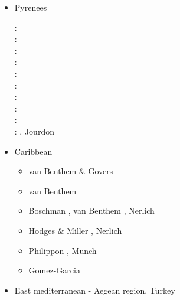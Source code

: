 \begin{itemize}
\item {Pyrenees} 

\begin{scriptsize}
\nineteenninetytwo: \cite{chou92}\\
\nineteenninetythree: \cite{qubh93}\\
\nineteenninetyeight: \cite{giju98}\\
\twothousand: \cite{bemh00}\\
\twothousandfour: \cite{mcmg04}\cite{siss04}\\
\twothousandten: \cite{jaml10}\\
\twothousandtwelve: \cite{vime12}\\
\twothousandthirteen: \cite{fihv13b}\\
\twothousandfourteen: \cite{jahm14}\\
\twothousandnineteen: \cite{dual19}, Jourdon \etal \cite{jolm19}
\end{scriptsize}

\item{Caribbean} 

\begin{scriptsize}
\begin{itemize}
\item[\twothousandten] van Benthem \& Govers \cite{vago10}
\item[\twothousandthirteen] van Benthem \etal \cite{vags13}
\item[\twothousandfourteen] Boschman \etal \cite{bovt14}, van Benthem \etal \cite{vagw14},
                            Nerlich \etal \cite{necb14}
\item[\twothousandfifteen] Hodges \& Miller \cite{homi15}, Nerlich \etal \cite{necb15}
\item[\twothousandtwenty] Philippon \etal \cite{phvb20}, Munch \etal \cite{mugu20}
\item[\twothousandtwentyone] Gomez-Garcia \etal\cite{gols21}
\end{itemize}
\end{scriptsize}

\item{East mediterranean - Aegean region, Turkey} 


\end{itemize}
